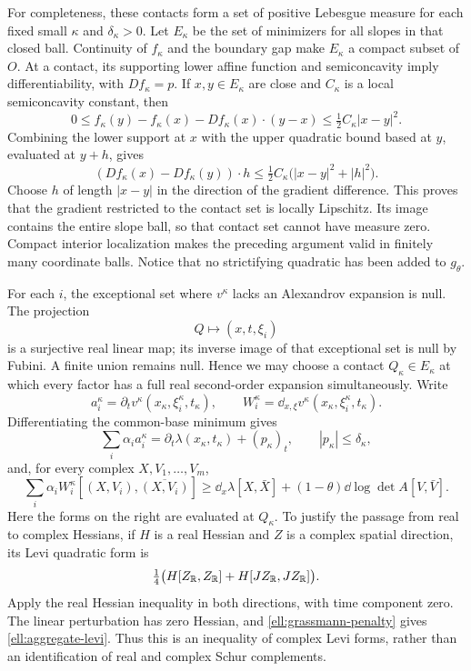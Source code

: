For completeness, these contacts form a set of positive Lebesgue
measure for each fixed small $\kappa$ and $\delta_\kappa>0$.
Let $E_\kappa$ be the set of minimizers for all slopes in that closed
ball.  Continuity of $f_\kappa$ and the boundary gap make $E_\kappa$
a compact subset of $O$.  At a contact, its supporting lower affine function and
semiconcavity imply differentiability, with $Df_\kappa=p$.
If $x,y\in E_\kappa$ are close and $C_\kappa$ is a local
semiconcavity constant, then
\[
 0\le f_\kappa(y)-f_\kappa(x)-Df_\kappa(x)\cdot(y-x)
 \le\tfrac12C_\kappa|x-y|^2.
\]
Combining the lower support at $x$ with the upper quadratic bound
based at $y$, evaluated at $y+h$, gives
\[
 (Df_\kappa(x)-Df_\kappa(y))\cdot h
 \le\tfrac12C_\kappa\bigl(|x-y|^2+|h|^2\bigr).
\]
Choose $h$ of length $|x-y|$ in the direction of the gradient
difference.  This proves that the gradient restricted to the contact
set is locally Lipschitz.  Its image contains the entire slope ball,
so that contact set cannot have measure zero.  Compact interior
localization makes the preceding argument valid in finitely many
coordinate balls.  Notice that no strictifying quadratic has been
added to $g_\theta$.

For each $i$, the exceptional set where $v^\kappa$ lacks an Alexandrov
expansion is null.  The projection
\[
 Q\longmapsto(x,t,\xi_i)
\]
is a surjective real linear map; its inverse image of that exceptional
set is null by Fubini.  A finite union remains null.  Hence we may
choose a contact $Q_\kappa\in E_\kappa$ at which every factor has a
full real second-order expansion simultaneously.  Write
\[
 a_i^\kappa=\partial_t v^\kappa(x_\kappa,\xi_i^\kappa,t_\kappa),
 \qquad W_i^\kappa=\dd_{x,\xi}v^\kappa
             (x_\kappa,\xi_i^\kappa,t_\kappa).
\]
Differentiating the common-base minimum gives
\begin{equation}\label{ell:time-sum}
 \sum_i\alpha_i a_i^\kappa
 =\partial_t\lambda(x_\kappa,t_\kappa)+(p_\kappa)_t,
 \qquad |p_\kappa|\le\delta_\kappa,
\end{equation}
and, for every complex $X,V_1,\ldots,V_m$,
\begin{equation}\label{ell:aggregate-levi}
 \sum_i\alpha_i W_i^\kappa[(X,V_i),\overline{(X,V_i)}]
 \ge\dd_x\lambda[X,\bar X]
      +(1-\theta)\dd\log\det A[V,\bar V].
\end{equation}
Here the forms on the right are evaluated at $Q_\kappa$.
To justify the passage from real to complex Hessians, if $H$ is a
real Hessian and $Z$ is a complex spatial direction, its Levi
quadratic form is
\[
 \tfrac14\bigl(H[Z_{\mathbb R},Z_{\mathbb R}]
                    +H[JZ_{\mathbb R},JZ_{\mathbb R}]\bigr).
\]
Apply the real Hessian inequality in both directions, with time
component zero.  The linear perturbation has zero Hessian, and
\eqref{ell:grassmann-penalty} gives
\eqref{ell:aggregate-levi}.  Thus this is an inequality of complex
Levi forms, rather than an identification of real and complex
Schur complements.

